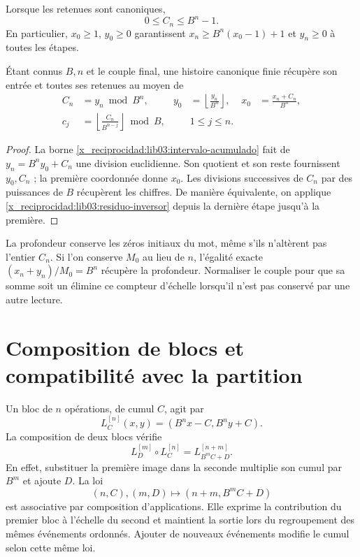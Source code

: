 Lorsque les retenues sont canoniques,
\begin{equation}
 0\leq C_n\leq B^n-1.
 \label{x_reciprocidad:lib03:intervalo-acumulado}
\end{equation}
En particulier, \(x_0\geq1\), \(y_0\geq0\) garantissent
\(x_n\geq B^n(x_0-1)+1\) et \(y_n\geq0\) à toutes les étapes.

\begin{corollary}
\label{x_reciprocidad:lib03:cor-palabra}
Étant connus \(B,n\) et le couple final, une histoire canonique finie
récupère son entrée et toutes ses retenues au moyen de
\begin{align}
 C_n&=y_n\bmod B^n,&
 y_0&=\left\lfloor\frac{y_n}{B^n}\right\rfloor,&
 x_0&=\frac{x_n+C_n}{B^n},
 \label{x_reciprocidad:lib03:recuperacion-inicial}\\
 c_j&=\left\lfloor\frac{C_n}{B^{n-j}}\right\rfloor\bmod B,
 &&1\leq j\leq n.
 \label{x_reciprocidad:lib03:recuperacion-digitos}
\end{align}
\end{corollary}

\begin{proof}
La borne \eqref{x_reciprocidad:lib03:intervalo-acumulado} fait de \(y_n=B^ny_0+C_n\) une division euclidienne. Son quotient et son reste fournissent \(y_0,C_n\) ; la première coordonnée donne \(x_0\). Les divisions successives de \(C_n\) par des puissances de \(B\) récupèrent les chiffres. De manière équivalente, on applique \eqref{x_reciprocidad:lib03:residuo-inversor} depuis la dernière étape jusqu'à la première.
\end{proof}

La profondeur conserve les zéros initiaux du mot, même s’ils
n’altèrent pas l’entier \(C_n\). Si l’on conserve \(M_0\) au lieu de
\(n\), l’égalité exacte \((x_n+y_n)/M_0=B^n\) récupère la
profondeur. Normaliser le couple pour que sa somme soit un élimine ce compteur
d’échelle lorsqu’il n’est pas conservé par une autre lecture.

\section{Composition de blocs et compatibilité avec la partition}
\label{x_reciprocidad:lib03:composicion}

Un bloc de \(n\) opérations, de cumul \(C\), agit par
\begin{equation}
 L_C^{[n]}(x,y)=(B^nx-C,B^ny+C).
 \label{x_reciprocidad:lib03:bloque}
\end{equation}
La composition de deux blocs vérifie
\begin{equation}
 L_D^{[m]}\circ L_C^{[n]}=L_{B^mC+D}^{[n+m]}.
 \label{x_reciprocidad:lib03:ley-bloques}
\end{equation}
En effet, substituer la première image dans la seconde multiplie son cumul par \(B^m\) et ajoute \(D\). La loi
\[
 (n,C),(m,D)\longmapsto(n+m,B^mC+D)
\]
est associative par composition d’applications. Elle exprime la contribution
du premier bloc à l’échelle du second et maintient la sortie lors du
regroupement des mêmes événements ordonnés. Ajouter de nouveaux événements modifie
le cumul selon cette même loi.

